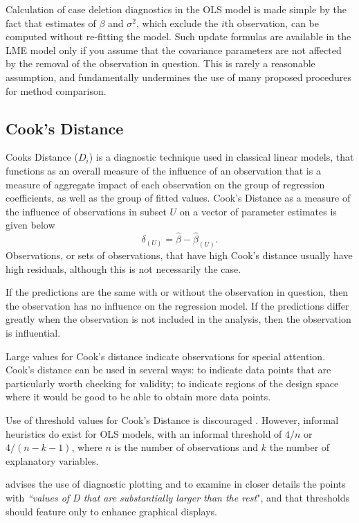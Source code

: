 \documentclass[12pt, a4paper]{report}
\theoremstyle{definition}
\theoremstyle{remark}
\begin{document}
	
Calculation of case deletion diagnostics in the OLS model is made simple by the fact that estimates of $\beta$ and $\sigma^2$, which exclude the $i$th observation, can be computed without re-fitting the model. Such update formulas are available in the LME model only if you assume that the covariance parameters are not affected by the removal of the observation in question. This is rarely a reasonable assumption, and fundamentally undermines the use of many proposed procedures for method comparison.


	
\subsection{Cook's Distance}

 Cooks Distance ($D_{i}$) is a diagnostic technique used in classical linear models, that functions as an overall measure of the influence of an observation that is a measure of aggregate impact of each observation on the group of regression coefficients, as well as the group of fitted values.  Cook's Distance as a measure of the influence of observations in subset $U$ on a vector of parameter estimates is given below \citep{cook77}
\[ \delta_{(U)} = \hat{\beta} - \hat{\beta}_{(U)}.\]
Observations, or sets of observations, that have high Cook's distance usually have high residuals, although this is not necessarily the case.


If the predictions are the same with or without the observation in question, then the observation has no influence on the regression model. If the predictions differ greatly when the observation is not included in the analysis, then the observation is influential.

Large values for Cook's distance indicate observations for special attention. Cook's distance can be used in several ways: to indicate data points that are particularly worth checking for validity; to indicate regions of the design space where it would be good to be able to obtain more data points.

Use of threshold values for Cook's Distance is discouraged \citep{fox1991}. However, informal heuristics do exist for OLS models, with an informal threshold of $4/n$ or $4/(n-k-1)$, where $n$ is the number of observations and $k$ the number of explanatory variables.

\citet{fox1991} advises the use of diagnostic plotting and to examine in closer details the points with \textit{``values of D that are substantially larger than the rest}", and that thresholds should feature only to enhance graphical displays.
\end{document}
